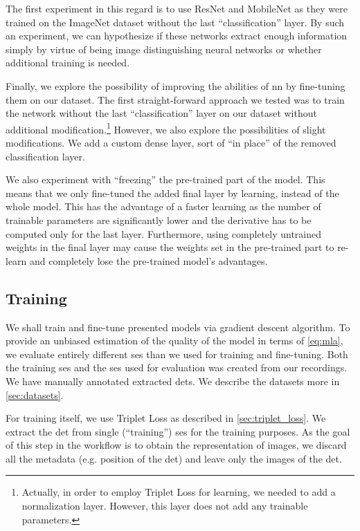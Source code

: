 The first experiment in this regard is to use ResNet and MobileNet as they were trained on the ImageNet dataset without the last ``classification'' layer. By such an experiment, we can hypothesize if these networks extract enough information simply by virtue of being image distinguishing neural networks or whether additional training is needed.

Finally, we explore the possibility of improving the abilities of \gls{nn} by fine-tuning them on our dataset. The first straight-forward approach we tested was to train the network without the last ``classification'' layer on our dataset without additional modification.\footnote{Actually, in order to employ Triplet Loss for learning, we needed to add a normalization layer. However, this layer does not add any trainable parameters.} However, we also explore the possibilities of slight modifications. We add a custom dense layer, sort of ``in place'' of the removed classification layer.

We also experiment with ``freezing'' the pre-trained part of the model. This means that we only fine-tuned the added final layer by learning, instead of the whole model. This has the advantage of a faster learning as the number of trainable parameters are significantly lower and the derivative has to be computed only for the last layer. Furthermore, using completely untrained weights in the final layer may cause the weights set in the pre-trained part to re-learn and completely lose the pre-trained model's advantages.

\subsection{Training}

We shall train and fine-tune presented models via gradient descent algorithm. To provide an unbiased estimation of the quality of the model in terms of \autoref{eq:mla}, we evaluate entirely different \gls{ses} than we used for training and fine-tuning. Both the training \gls{ses} and the \gls{ses} used for evaluation was created from our recordings. We have manually annotated extracted \glspl{det}. We describe the datasets more in \autoref{sec:datasets}.

For training itself, we use Triplet Loss as described in \autoref{sec:triplet_loss}. We extract the \gls{det} from single (``training'') \gls{ses} for the training purposes. As the goal of this step in the workflow is to obtain the representation of images, we discard all the metadata (e.g. position of the \gls{det}) and leave only the images of the \gls{det}.


